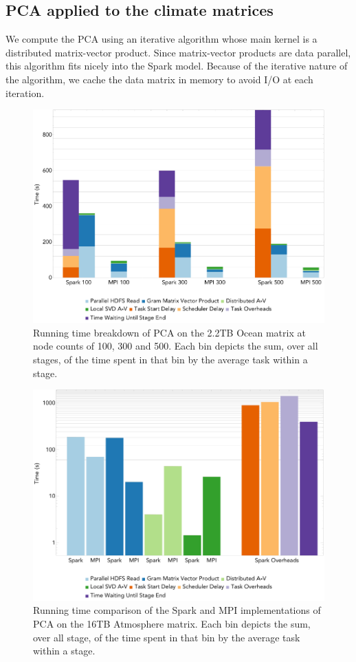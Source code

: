 \subsection{PCA applied to the climate matrices}

We compute the PCA using an iterative algorithm whose main kernel is a distributed matrix-vector product. Since matrix-vector products are data parallel, this algorithm fits nicely into the Spark model. Because of the iterative nature of the algorithm, we cache the data matrix in memory to avoid I/O at each iteration.

\begin{figure}[th!]
\centering
\includegraphics[width=.9\textwidth]{fig/ocean_pca_times.png}
\caption{Running time breakdown of PCA on the 2.2TB Ocean matrix at node counts of 100, 300 and 500. Each bin depicts the sum, over all stages, of the time spent in that bin by the average task within a stage.}
\label{fig:pcart}
\end{figure}

\begin{figure}[th!]
\centering
\includegraphics[width=.9\textwidth]{fig/hero_pca_times.png}
\caption{Running time comparison of the Spark and MPI implementations of PCA on the 16TB Atmosphere matrix. Each bin depicts the sum, over all stage, of the time spent in that bin by the average task within a stage.}
\label{fig:hero}
\end{figure}

